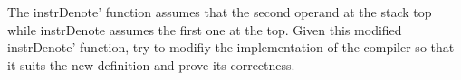The instrDenote' function assumes that the second operand at the stack top while instrDenote assumes the first one at the top. Given this modified instrDenote' function, try to modifiy the implementation of the compiler so that it suits the new definition and prove its correctness. \begin{coqdoccode}
\coqdocemptyline
\end{coqdoccode}
